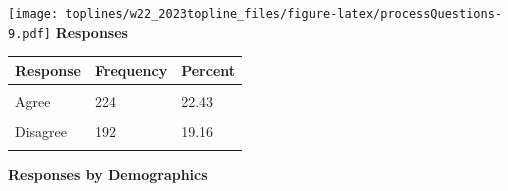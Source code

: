 \documentclass[]{article}
\begin{document}
\texttt{[image: toplines/w22\_2023topline\_files/figure-latex/processQuestions-9.pdf]}
\textbf{Responses}

\begin{tabu} to 
\toprule
Response & Frequency & Percent\\
\midrule
{} &  & \\
Agree & 224 & 22.43\\
 &  & \\
Disagree & 192 & 19.16\\
 &  & \\
\bottomrule
\end{tabu}

\textbf{Responses by Demographics}\begingroup\fontsize{7}{9}\selectfont
\end{document}
